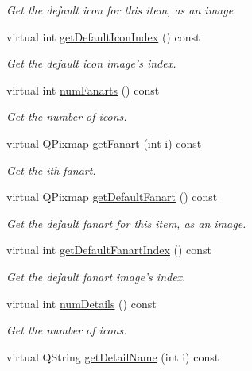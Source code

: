 \begin{DoxyCompactItemize}
\begin{DoxyCompactList}\small\item\em Get the default icon for this item, as an image. \end{DoxyCompactList}\item 
virtual int \hyperlink{class_a_w_e_1_1_media_item_acc425dbbde763177c9d79d83d48f87cc}{get\-Default\-Icon\-Index} () const 
\begin{DoxyCompactList}\small\item\em Get the default icon image's index. \end{DoxyCompactList}\item 
virtual int \hyperlink{class_a_w_e_1_1_media_item_af7523517745f5dfcf30a37dd1044991e}{num\-Fanarts} () const 
\begin{DoxyCompactList}\small\item\em Get the number of icons. \end{DoxyCompactList}\item 
virtual Q\-Pixmap \hyperlink{class_a_w_e_1_1_media_item_a3b171a9b398dc097a94cf8f5d1c94b58}{get\-Fanart} (int i) const 
\begin{DoxyCompactList}\small\item\em Get the {\ttfamily i}th fanart. \end{DoxyCompactList}\item 
virtual Q\-Pixmap \hyperlink{class_a_w_e_1_1_media_item_abe9fcab2d0853b360b3af4b3b366a945}{get\-Default\-Fanart} () const 
\begin{DoxyCompactList}\small\item\em Get the default fanart for this item, as an image. \end{DoxyCompactList}\item 
virtual int \hyperlink{class_a_w_e_1_1_media_item_af12519450111a095a0de62c13a577414}{get\-Default\-Fanart\-Index} () const 
\begin{DoxyCompactList}\small\item\em Get the default fanart image's index. \end{DoxyCompactList}\item 
virtual int \hyperlink{class_a_w_e_1_1_media_item_a4c7fb30c5eb3963b1c2c66b626dc3487}{num\-Details} () const 
\begin{DoxyCompactList}\small\item\em Get the number of icons. \end{DoxyCompactList}\item 
virtual Q\-String \hyperlink{class_a_w_e_1_1_media_item_a467117453601b932573918b970cff0ef}{get\-Detail\-Name} (int i) const 

\end{DoxyCompactItemize}

